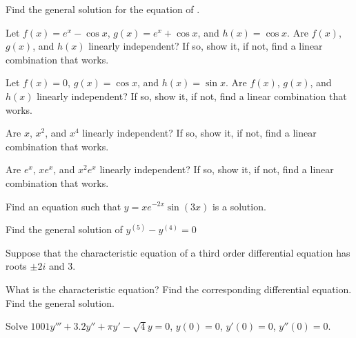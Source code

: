 \begin{exercise}
Find the general solution for the equation of .
\end{exercise}

\begin{exercise}
Let
$f(x) = e^x - \cos x$, $g(x) = e^x + \cos x$, and $h(x) = \cos x$.
Are $f(x)$, $g(x)$, and $h(x)$
linearly independent?  If so, show
it, if not, find a linear combination that works.
\end{exercise}

\begin{exercise}
Let
$f(x) = 0$, $g(x) = \cos x$, and $h(x) = \sin x$.
Are $f(x)$, $g(x)$, and $h(x)$
linearly independent?  If so, show
it, if not, find a linear combination that works.
\end{exercise}

\begin{exercise}
Are $x$, $x^2$, and $x^4$
linearly independent?  If so, show
it, if not, find a linear combination that works.
\end{exercise}

\begin{exercise}
Are $e^x$, $xe^x$, and $x^2e^x$
linearly independent?  If so, show
it, if not, find a linear combination that works.
\end{exercise}

\begin{exercise}
Find an equation such that $y=xe^{-2x}\sin(3x)$ is a solution.
\end{exercise}

\setcounter{exercise}{100}

\begin{exercise}
Find the general solution of $y^{(5)}-y^{(4)}=0$
\end{exercise}

\begin{exercise}
Suppose that the characteristic equation of a third order differential
equation has
roots $\pm 2i$ and 3.
\begin{tasks}
\task
What is the characteristic equation?
\task
Find the
corresponding differential equation.
\task
Find the general solution.
\end{tasks}
\end{exercise}

\begin{exercise}
Solve $1001y'''+3.2y''+\pi y'-\sqrt{4} y = 0$, $y(0)=0$, $y'(0) = 0$,
$y''(0) = 0$.
\end{exercise}

